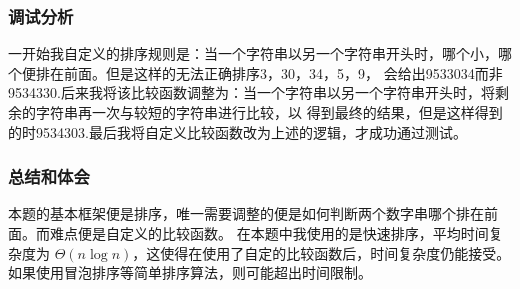 \subsubsection{调试分析}
一开始我自定义的排序规则是：当一个字符串以另一个字符串开头时，哪个小，哪个便排在前面。但是这样的无法正确排序3，30，34，5，9，
会给出9533034而非9534330.后来我将该比较函数调整为：当一个字符串以另一个字符串开头时，将剩余的字符串再一次与较短的字符串进行比较，以
得到最终的结果，但是这样得到的时9534303.最后我将自定义比较函数改为上述的逻辑，才成功通过测试。
\subsubsection{总结和体会}
本题的基本框架便是排序，唯一需要调整的便是如何判断两个数字串哪个排在前面。而难点便是自定义的比较函数。
在本题中我使用的是快速排序，平均时间复杂度为 $\Theta(n\log n)$，这使得在使用了自定的比较函数后，时间复杂度仍能接受。
如果使用冒泡排序等简单排序算法，则可能超出时间限制。